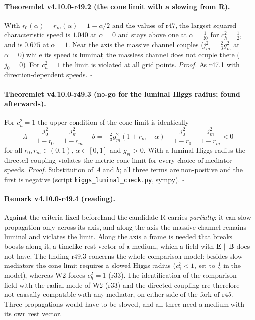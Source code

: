 \paragraph{Theoremlet v4.10.0-r49.2 (the cone limit with a slowing from R).}
With \(r_0(\alpha)=r_m(\alpha)=1-\alpha/2\) and the values of r47, the largest squared characteristic speed is \(1.040\) at \(\alpha=0\) and stays above one at \(\alpha=\tfrac1{20}\) for
\(c_h^2=\tfrac12\), and is \(0.675\) at \(\alpha=1\).  Near the axis the massive channel couples (\(j_m^2=\tfrac23g_m^2\) at \(\alpha=0\)) while its speed is luminal; the massless channel
does not couple there (\(j_0=0\)).  For \(c_h^2=1\) the limit is violated at all grid points.
\emph{Proof.} As r47.1 with direction-dependent speeds.  \(\square\)

\paragraph{Theoremlet v4.10.0-r49.3 (no-go for the luminal Higgs radius; found afterwards).}
For \(c_h^2=1\) the upper condition of the cone limit is identically
\[
 A-\frac{j_0^2}{1-r_0}-\frac{j_m^2}{1-r_m}-b=-\tfrac23g_m^2(1+r_m-\alpha)-\frac{j_0^2}{1-r_0}-\frac{j_m^2}{1-r_m}<0
\]
for all \(r_0,r_m\in(0,1)\), \(\alpha\in[0,1]\) and \(g_m>0\).  With a luminal Higgs radius the directed coupling violates the metric cone limit for every choice of mediator speeds.
\emph{Proof.} Substitution of \(A\) and \(b\); all three terms are non-positive and the first is negative (script \texttt{higgs\_\allowbreak luminal\_\allowbreak check.py}, sympy).  \(\square\)

\paragraph{Remark v4.10.0-r49.4 (reading).}
Against the criteria fixed beforehand the candidate R carries \emph{partially}: it can slow propagation only across its axis, and along the axis the
massive channel remains luminal and violates the limit.  Along the axis a frame is needed that breaks boosts along it, a timelike rest vector of a
medium, which a field with \(\mathbf E\parallel\mathbf B\) does not have.  The finding r49.3 concerns the whole comparison model: besides slow mediators the cone limit
requires a slowed Higgs radius (\(c_h^2<1\), set to \(\tfrac12\) in the model), whereas W2 forces \(c_h^2=1\) (r33).  The identification of the comparison field with
the radial mode of W2 (r33) and the directed coupling are therefore not causally compatible with any mediator, on either side of the fork of r45.
Three propagations would have to be slowed, and all three need a medium with its own rest vector.

